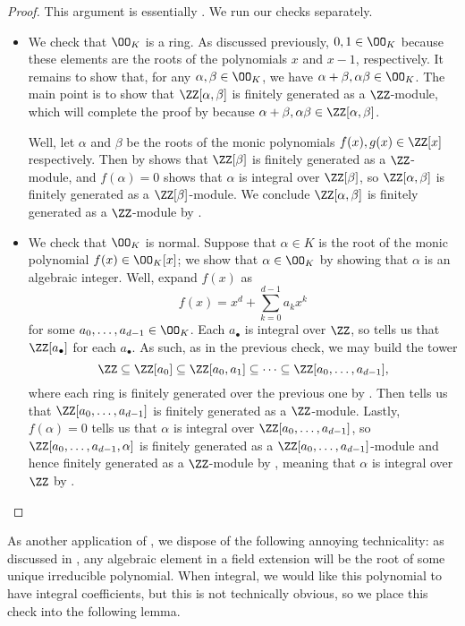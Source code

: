 \documentclass[../notes.tex]{subfiles}
\begin{document}
\begin{proof}
	This argument is essentially . We run our checks separately.
	\begin{itemize}
		\item We check that $\OO_K$ is a ring. As discussed previously, $0,1\in\OO_K$ because these elements are the roots of the polynomials $x$ and $x-1$, respectively. It remains to show that, for any $\alpha,\beta\in\OO_K$, we have $\alpha+\beta,\alpha\beta\in\OO_K$. The main point is to show that $\ZZ[\alpha,\beta]$ is finitely generated as a $\ZZ$-module, which will complete the proof by  because $\alpha+\beta,\alpha\beta\in\ZZ[\alpha,\beta]$.
	
		Well, let $\alpha$ and $\beta$ be the roots of the monic polynomials $f(x),g(x)\in\ZZ[x]$ respectively. Then by  shows that $\ZZ[\beta]$ is finitely generated as a $\ZZ$-module, and $f(\alpha)=0$ shows that $\alpha$ is integral over $\ZZ[\beta]$, so $\ZZ[\alpha,\beta]$ is finitely generated as a $\ZZ[\beta]$-module. We conclude $\ZZ[\alpha,\beta]$ is finitely generated as a $\ZZ$-module by .

		\item We check that $\OO_K$ is normal. Suppose that $\alpha\in K$ is the root of the monic polynomial $f(x)\in\OO_K[x]$; we show that $\alpha\in\OO_K$ by showing that $\alpha$ is an algebraic integer. Well, expand $f(x)$ as
		\[f(x)=x^d+\sum_{k=0}^{d-1}a_kx^k\]
		for some $a_0,\ldots,a_{d-1}\in\OO_K$. Each $a_\bullet$ is integral over $\ZZ$, so  tells us that $\ZZ[a_\bullet]$ for each $a_\bullet$. As such, as in the previous check, we may build the tower
		\[\ZZ\subseteq\ZZ[a_0]\subseteq\ZZ[a_0,a_1]\subseteq\cdots\subseteq\ZZ[a_0,\ldots,a_{d-1}],\]
		where each ring is finitely generated over the previous one by . Then  tells us that $\ZZ[a_0,\ldots,a_{d-1}]$ is finitely generated as a $\ZZ$-module. Lastly, $f(\alpha)=0$ tells us that $\alpha$ is integral over $\ZZ[a_0,\ldots,a_{d-1}]$, so $\ZZ[a_0,\ldots,a_{d-1},\alpha]$ is finitely generated as a $\ZZ[a_0,\ldots,a_{d-1}]$-module and hence finitely generated as a $\ZZ$-module by , meaning that $\alpha$ is integral over $\ZZ$ by .
		\qedhere
	\end{itemize}
\end{proof}
As another application of , we dispose of the following annoying technicality: as discussed in , any algebraic element in a field extension will be the root of some unique irreducible polynomial. When integral, we would like this polynomial to have integral coefficients, but this is not technically obvious, so we place this check into the following lemma.
\end{document}
